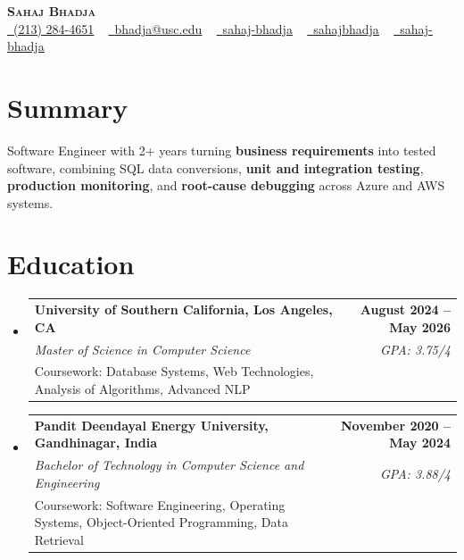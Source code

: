 \documentclass[letterpaper,10pt]{article}
\makeatletter
\newcommand{\sectionGap}{\vspace{-8pt}}
\newcommand{\resumeEduSubheading}[5]{\vspace{-1pt}\item\begin{tabular*}{1.0\textwidth}[t]{l@{\extracolsep{\fill}}r}\textbf{#1} & \textbf{\small #2} \\\textit{\small #3} & \textit{\small #4} \\\small #5 & \\\end{tabular*}\vspace{-4pt}}
\newcommand{\resumeSubHeadingListStart}{\begin{itemize}[leftmargin=0.0in, label={}]}
\newcommand{\resumeSubHeadingListEnd}{\end{itemize}}
\makeatother
\begin{document}
\begin{center}
{\Huge \scshape \textbf{Sahaj Bhadja}} \\ \vspace{1pt}
\small \href{tel:2132844651}{\faPhone\ \underline{(213) 284-4651}} ~ \href{mailto:bhadja@usc.edu}{\raisebox{-0.2\height}\faEnvelope\ \underline{bhadja@usc.edu}} ~
\href{https://www.linkedin.com/in/sahaj-bhadja/}{\raisebox{-0.2\height}\faLinkedin\ \underline{sahaj-bhadja}} ~ \href{https://github.com/SAHAJ-BHADJA}{\raisebox{-0.2\height}\faGithub\ \underline{sahajbhadja}} ~
\href{https://sahaj-bhadja.vercel.app/}{\raisebox{-0.2\height}\faGlobe\ \underline{sahaj-bhadja}}
\end{center}
\vspace{-16pt}
\section{Summary}
\begin{itemize}[leftmargin=0.15in, label={}]
\small{\item{Software Engineer with 2+ years turning \textbf{business requirements} into tested software, combining SQL data conversions, \textbf{unit and integration testing}, \textbf{production monitoring}, and \textbf{root-cause debugging} across Azure and AWS systems.}}
\end{itemize}
\sectionGap
\section{Education}
\resumeSubHeadingListStart
\resumeEduSubheading{University of Southern California, Los Angeles, CA}{August 2024 -- May 2026}{Master of Science in Computer Science}{GPA: 3.75/4}{Coursework: Database Systems, Web Technologies, Analysis of Algorithms, Advanced NLP}
\resumeEduSubheading{Pandit Deendayal Energy University, Gandhinagar, India}{November 2020 -- May 2024}{Bachelor of Technology in Computer Science and Engineering}{GPA: 3.88/4}{Coursework: Software Engineering, Operating Systems, Object-Oriented Programming, Data Retrieval}
\resumeSubHeadingListEnd
\sectionGap
\end{document}
